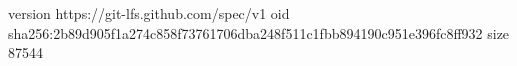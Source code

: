 version https://git-lfs.github.com/spec/v1
oid sha256:2b89d905f1a274c858f73761706dba248f511c1fbb894190c951e396fc8ff932
size 87544
